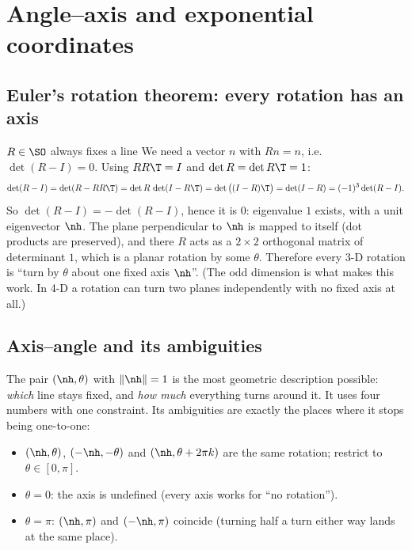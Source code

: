 \section{Angle--axis and exponential coordinates}\label{sec:rot:exponential-coordinates}

\subsection{Euler's rotation theorem: every rotation has an axis}\label{sec:rot:euler-s-rotation}
\begin{deriv}{$R\in\SO$ always fixes a line}
We need a vector $n$ with $Rn=n$, i.e.\ $\det(R-I)=0$. Using $RR\T=I$ and $\det R=\det R\T=1$:
\[
\det(R-I)=\det(R-RR\T)=\det R\,\det(I-R\T)=\det\big((I-R)\T\big)=\det(I-R)=(-1)^3\det(R-I).
\]
So $\det(R-I)=-\det(R-I)$, hence it is $0$: eigenvalue $1$ exists, with a unit eigenvector $\nh$. The plane perpendicular to $\nh$ is mapped to itself (dot products are preserved), and there $R$ acts as a $2\times2$ orthogonal matrix of determinant $1$, which is a planar rotation by some $\theta$. Therefore every 3-D rotation is ``turn by $\theta$ about one fixed axis $\nh$''. (The odd dimension is what makes this work. In 4-D a rotation can turn two planes independently with no fixed axis at all.)
\end{deriv}

\subsection{Axis--angle and its ambiguities}\label{sec:rot:axis-angle-ambiguities}
The pair $(\nh,\theta)$ with $\|\nh\|=1$ is the most geometric description possible: \emph{which} line stays fixed, and \emph{how much} everything turns around it. It uses four numbers with one constraint. Its ambiguities are exactly the places where it stops being one-to-one:
\begin{itemize}
\item $(\nh,\theta)$, $(-\nh,-\theta)$ and $(\nh,\theta+2\pi k)$ are the same rotation; restrict to $\theta\in[0,\pi]$.
\item $\theta=0$: the axis is undefined (every axis works for ``no rotation'').
\item $\theta=\pi$: $(\nh,\pi)$ and $(-\nh,\pi)$ coincide (turning half a turn either way lands at the same place).
\end{itemize}

